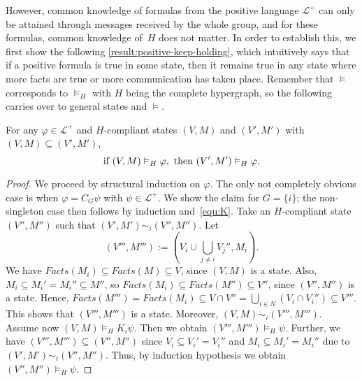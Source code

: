 \documentclass{article}
\newcounter{#1}
\newcommand{\state}[1][]{\ensuremath{(V#1,M#1)}\xspace}
\newcommand{\knows}[1]{\ensuremath{K_{#1}}\xspace}
\newcommand{\ck}[1]{\ensuremath{C_{#1}}\xspace}\newcommand{\Facts}{\mathit{Facts}}
\renewcommand{\enspace}{}
\begin{document}
However, common knowledge of formulas from the positive language $\mathcal{L}^+$
can only be attained through messages received by the whole group,
and for these formulas, common knowledge of~$H$ does not matter.
In order to establish this,
we first show the following \cref{result:positive-keep-holding}, which intuitively says that
if a positive formula is true in some state,
then it remains true in any state where more facts are true
or more communication has taken place.
Remember that $\vDash$ corresponds to $\vDash_H$ with $H$ being the complete hypergraph,
so the following carries over to general states and $\vDash$.
\begin{lemma}
  \label{result:positive-keep-holding}
  For any $\varphi\in\mathcal{L}^+$ and $H$-compliant states $\state $ and \state[']
  with $\state\subseteq\state[']$,
\[
    \textup{if } \state\vDash_H\varphi, \textup{ then } \state['] \vDash_H\varphi.
\]
\end{lemma}
\begin{proof}
  We proceed by structural induction on $\varphi$.
  The only not completely obvious case is when
  $\varphi=\ck G\psi$ with $\psi\in\mathcal{L}^+$.
  We show the claim for $G=\{i\}$; the non-singleton case then follows by induction and~\eqref{equ:K}.
  Take an $H$-compliant state \state[''] such that $\state[']\sim_i\state['']$.
  Let \[
  \state['''] := (V_i\cup\textstyle\bigcup_{j\neq i}V_j'',M_i)\enspace.
  \]
  We have $\Facts(M_i)\subseteq\Facts(M)\subseteq V$,
  since \state is a state.
  Also, $M_i\subseteq M_i'=M_i''\subseteq M''$,
  so $\Facts(M_i)\subseteq\Facts(M'')\subseteq V''$,
  since \state[''] is a state.
  Hence,
$ \Facts(M''')=\Facts(M_i)\subseteq V\cap V''=\textstyle\bigcup_{i\in N}(V_i\cap V_i'')\subseteq V'''\enspace.
$ This shows that \state['''] is a state. Moreover, $\state\sim_i\state[''']$.
  Assume now $\state\vDash_H \knows i\psi$.
  Then we obtain $\state[''']\vDash_H\psi$.
  Further, we have $\state[''']\subseteq\state['']$
  since $V_i\subseteq V_i'=V_i''$ and $M_i\subseteq M_i'=M_i''$ due to $\state[']\sim_i\state['']$.
  Thus, by induction hypothesis we obtain $\state['']\vDash_H\psi$.
\end{proof}
\end{document}
